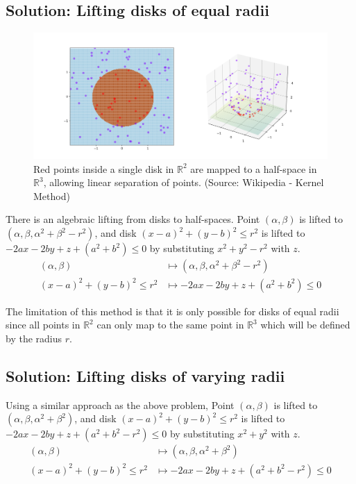 \documentclass{NSF}
\begin{document}
\subsection{Solution: Lifting disks of equal radii}
\begin{figure}[ht]
\centering
\includegraphics[width=\textwidth]{kernel-trick}
\caption{Red points inside a single disk in $\mathbb{R}^2$ are mapped to a half-space in $\mathbb{R}^3$, allowing linear separation of points.  (Source: Wikipedia - Kernel Method) }
\end{figure}

There is an algebraic lifting from disks to half-spaces. Point $(\alpha,\beta)$ is lifted to $(\alpha,\beta,\alpha^2+\beta^2-r^2)$, and disk $(x-a)^2+(y-b)^2\leq r^2$ is lifted to $-2ax -2by + z + (a^2+b^2) \leq 0$ by substituting  $x^2+y^2-r^2$ with $z$. 
\begin{align*}
(\alpha,\beta) & \mapsto (\alpha,\beta,\alpha^2+\beta^2-r^2) \\
(x-a)^2+(y-b)^2\leq r^2 & \mapsto -2ax -2by + z + (a^2+b^2) \leq 0
\end{align*}

The limitation of this method is that it is only possible for disks of equal radii since all points in $\mathbb{R}^2$ can only map to the same point in $\mathbb{R}^3$ which will be defined by the radius $r$.

\subsection{Solution: Lifting disks of varying radii}
Using a similar approach as the above problem, Point $(\alpha,\beta)$ is lifted to $(\alpha,\beta,\alpha^2+\beta^2)$, and disk $(x-a)^2+(y-b)^2\leq r^2$ is lifted to $-2ax -2by + z + (a^2+b^2-r^2) \leq 0$ by substituting  $x^2+y^2$ with $z$. 
\begin{align*}
(\alpha,\beta) & \mapsto (\alpha,\beta,\alpha^2+\beta^2) \\
(x-a)^2+(y-b)^2\leq r^2 & \mapsto -2ax -2by + z + (a^2+b^2-r^2) \leq 0
\end{align*}
\end{document}
